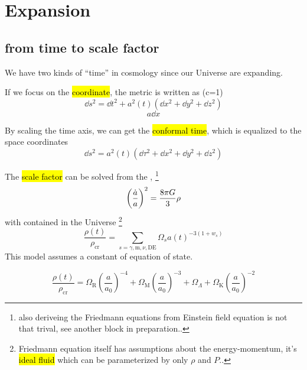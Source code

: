 
\section{Expansion}

\subsection{from time to scale factor}

We have two kinds of ``time'' in cosmology since our Universe are expanding. 

If we focus on the \hl{coordinate}, the metric is written as (c=1)
\begin{equation}
    \dd s^2 = \dd t^2 + a^2(t) (\dd x^2 + \dd y^2 + \dd z^2)
\end{equation}
\begin{equation}
    a\dd{x}
\end{equation}


By scaling the time axis, we can get the \hl{conformal time}, which is equalized to the space coordinates
\begin{equation}
    \dd s^2 = a^2(t) (\dd \tau^2 + \dd x^2 + \dd y^2 + \dd z^2)
\end{equation}

The \hl{scale factor} can be solved from the , 
\footnote{also deriveing the Friedmann equations from Einstein field equation is not that trival, see another block in preparation..}
\begin{equation}
    {\qty(\frac{\dot{a}}{a})}^2 = \frac{8\pi G}{3} \rho
\end{equation}
with  contained in the Universe 
\footnote{Friedmann equation itself has assumptions about the energy-momentum, it's \hl{ideal fluid} which can be parameterized by only $\rho$ and $P$..}
\begin{equation}
    \frac{\rho(t)}{\rho_{\mathrm{cr}}} = \sum_{s=\gamma, \mathrm{m}, \nu, \mathrm{DE}} \Omega_{s} {a(t)}^{-3 (1 + w_{s})} 
\end{equation}
This model assumes a constant of equation of state. 


\begin{equation}
    \frac{\rho(t)}{\rho_{\mathrm{cr}}} = \Omega_{\mathrm{R}} \left(\frac{a}{a_0}\right)^{-4} + \Omega_{\mathrm{M}} \left(\frac{a}{a_0}\right)^{-3} + \Omega_\Lambda + \Omega_{\mathrm{K}} \left(\frac{a}{a_0}\right)^{ -2}
\end{equation}




